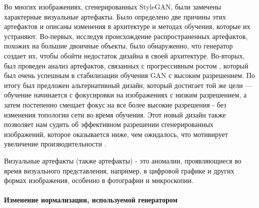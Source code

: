Во многих изображениях, сгенерированных StyleGAN,  были замечены характерные визуальные артефакты. Было определено две причины этих артефактов и описаны изменения в архитектуре и методах обучения, которые их устраняют. Во-первых, исследуя происхождение распространенных артефактов, похожих на большие двоичные объекты, было обнаруженно, что генератор создает их, чтобы обойти недостаток дизайна в своей архитектуре. Во-вторых, был проведен анализ артефактов, связанных с прогрессивным ростом \cite{progressive_growing_of_gans}, который был очень успешным в стабилизации обучения GAN с высоким разрешением. По итогу был предложен альтернативный дизайн, который достигает той же цели — обучение начинается с фокусировки на изображениях с низким разрешением, а затем постепенно смещает фокус на все более высокие разрешения - без изменения топологии сети во время обучения. Этот новый дизайн также позволяет нам судить об эффективном разрешении сгенерированных изображений, которое оказывается ниже, чем ожидалось, что мотивирует увеличение производительности \cite{StyleGAN2}.

\begin{definition}
    Визуальные артефакты (также артефакты) - это аномалии, проявляющиеся во время визуального представления, например, в цифровой графике и других формах изображения, особенно в фотографии и микроскопии.
\end{definition}

\paragraph{Изменение нормализации, используемой генератором}

